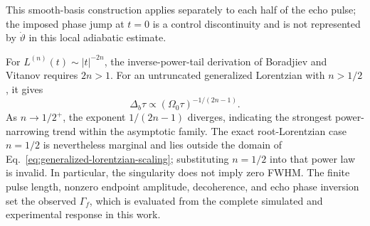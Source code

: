 This smooth-basis construction applies separately to each half of the echo
pulse; the imposed phase jump at $t=0$ is a control discontinuity and is not
represented by $\dot\vartheta$ in this local adiabatic estimate.

For $L^{(n)}(t)\sim|t|^{-2n}$, the inverse-power-tail derivation of
Boradjiev and Vitanov requires $2n>1$.  For an untruncated generalized
Lorentzian with $n>1/2$, it gives
\begin{equation}
    \Delta_b\tau
    \propto
    (\Omega_0\tau)^{-1/(2n-1)}.
    \label{eq:generalized-lorentzian-scaling}
\end{equation}
As $n\to1/2^+$, the exponent $1/(2n-1)$ diverges, indicating the strongest
power-narrowing trend within the asymptotic family.  The exact
root-Lorentzian case $n=1/2$ is nevertheless marginal and lies outside the
domain of Eq.~\eqref{eq:generalized-lorentzian-scaling}; substituting
$n=1/2$ into that power law is invalid.  In particular, the singularity does
not imply zero FWHM.  The finite pulse length, nonzero endpoint amplitude,
decoherence, and echo phase inversion set the observed $\Gamma_f$, which is
evaluated from the complete simulated and experimental response in this work.
